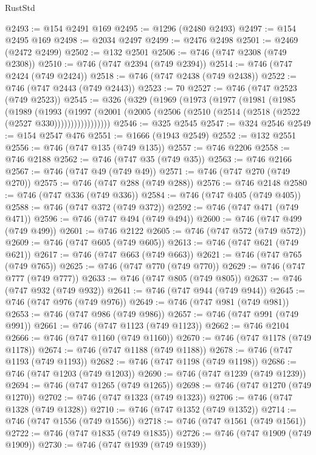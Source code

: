 \begin{lexlean}{RustStd}
\begin{coremodule}
@2493 := @154 @2491 @169
@2495 := @1296 (@2480 @2493)
@2497 := @154 @2495 @169
@2498 := @2034 @2497
@2499 := @2476 @2498
@2501 := @2469 (@2472 @2499)
@2502 := @132 @2501
@2506 := @746 (@747 @2308 (@749 @2308))
@2510 := @746 (@747 @2394 (@749 @2394))
@2514 := @746 (@747 @2424 (@749 @2424))
@2518 := @746 (@747 @2438 (@749 @2438))
@2522 := @746 (@747 @2443 (@749 @2443))
@2523 := 70
@2527 := @746 (@747 @2523 (@749 @2523))
@2545 := @326
    (@329
      (@1969
        (@1973
          (@1977
            (@1981
              (@1985
                (@1989
                  (@1993
                    (@1997
                      (@2001 (@2005 (@2506 (@2510 (@2514 (@2518 (@2522 (@2527 @330)))))))))))))))))
@2546 := @325 @2545
@2547 := @324 @2546
@2549 := @154 @2547 @476
@2551 := @1666 (@1943 @2549)
@2552 := @132 @2551
@2556 := @746 (@747 @135 (@749 @135))
@2557 := @746 @2206
@2558 := @746 @2188
@2562 := @746 (@747 @35 (@749 @35))
@2563 := @746 @2166
@2567 := @746 (@747 @49 (@749 @49))
@2571 := @746 (@747 @270 (@749 @270))
@2575 := @746 (@747 @288 (@749 @288))
@2576 := @746 @2148
@2580 := @746 (@747 @336 (@749 @336))
@2584 := @746 (@747 @405 (@749 @405))
@2588 := @746 (@747 @372 (@749 @372))
@2592 := @746 (@747 @471 (@749 @471))
@2596 := @746 (@747 @494 (@749 @494))
@2600 := @746 (@747 @499 (@749 @499))
@2601 := @746 @2122
@2605 := @746 (@747 @572 (@749 @572))
@2609 := @746 (@747 @605 (@749 @605))
@2613 := @746 (@747 @621 (@749 @621))
@2617 := @746 (@747 @663 (@749 @663))
@2621 := @746 (@747 @765 (@749 @765))
@2625 := @746 (@747 @770 (@749 @770))
@2629 := @746 (@747 @777 (@749 @777))
@2633 := @746 (@747 @805 (@749 @805))
@2637 := @746 (@747 @932 (@749 @932))
@2641 := @746 (@747 @944 (@749 @944))
@2645 := @746 (@747 @976 (@749 @976))
@2649 := @746 (@747 @981 (@749 @981))
@2653 := @746 (@747 @986 (@749 @986))
@2657 := @746 (@747 @991 (@749 @991))
@2661 := @746 (@747 @1123 (@749 @1123))
@2662 := @746 @2104
@2666 := @746 (@747 @1160 (@749 @1160))
@2670 := @746 (@747 @1178 (@749 @1178))
@2674 := @746 (@747 @1188 (@749 @1188))
@2678 := @746 (@747 @1193 (@749 @1193))
@2682 := @746 (@747 @1198 (@749 @1198))
@2686 := @746 (@747 @1203 (@749 @1203))
@2690 := @746 (@747 @1239 (@749 @1239))
@2694 := @746 (@747 @1265 (@749 @1265))
@2698 := @746 (@747 @1270 (@749 @1270))
@2702 := @746 (@747 @1323 (@749 @1323))
@2706 := @746 (@747 @1328 (@749 @1328))
@2710 := @746 (@747 @1352 (@749 @1352))
@2714 := @746 (@747 @1556 (@749 @1556))
@2718 := @746 (@747 @1561 (@749 @1561))
@2722 := @746 (@747 @1835 (@749 @1835))
@2726 := @746 (@747 @1909 (@749 @1909))
@2730 := @746 (@747 @1939 (@749 @1939))

\end{coremodule}
\end{lexlean}

